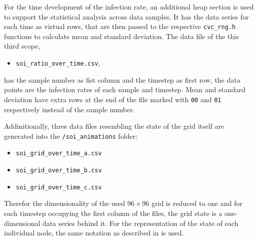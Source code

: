 For the time development of the infection rate, an additional heap section is used to support the statistical analysis across data samples. It has the data series for each time as virtual rows,
that are then passed to the respective \texttt{cvc\_rng.h} functions to calculate mean and standard deviation. The data file of the this third scope,
\begin{itemize}
    \item \texttt{soi\_ratio\_over\_time.csv},
\end{itemize}
has the sample number as fist column and the timestep as first row, the data points are the infection rates of each sample and timestep. 
Mean and standard deviation have extra rows at the end of the file marked with \texttt{00} and \texttt{01} respectively instead of the sample number.

Addinitionally, three data files resembling the state of the grid itself are generated into the \texttt{/soi\_animations} folder:
\begin{itemize}
    \item \texttt{soi\_grid\_over\_time\_a.csv}
    \item \texttt{soi\_grid\_over\_time\_b.csv}
    \item \texttt{soi\_grid\_over\_time\_c.csv}
\end{itemize}

Therefor the dimensionality of the used $96\times 96$ grid is reduced to one and for each timestep occupying the first column of the files, the grid state is a one-dimensional data series behind it.
For the representation of the state of each individual node, the same notation as described in  is used.


